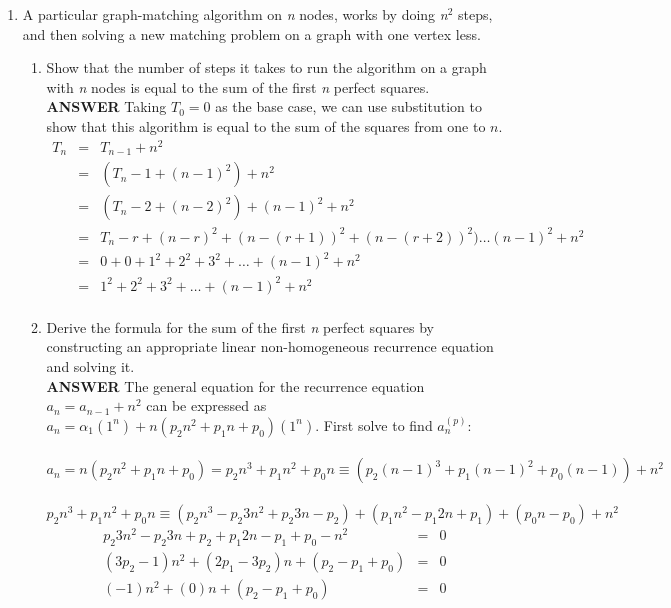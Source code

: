 \documentclass{article}
\begin{document}
\begin{enumerate}
\item
 A particular graph-matching algorithm on \textit{n} nodes,
works by doing \textit{n}$^{\mathit{2}}$ steps, and then solving a
new matching problem on a graph with one vertex less.

\begin{enumerate}
\item
 Show that the number of steps it takes to run the algorithm on a
graph with \textit{n} nodes is equal to the sum of the first
\textit{n}
perfect squares.\\
\vskip 10pt  \textbf{ANSWER}
 Taking $T_0 = 0$ as the base case, we can use substitution to show that this algorithm
is equal to the sum of the squares from one to $n$.
\begin{eqnarray*}
T_n & = & T_{n-1} + n^2 \\
& = & (T_n-1 + (n-1)^2) + n^2\\
& = & (T_n-2 + (n-2)^2) + (n-1)^2 + n^2\\
& = & T_n-r + (n-r)^2 + (n-(r+1))^2 + (n-(r+2))^2) \ldots (n-1)^2 + n^2\\
& = & 0 + 0 + 1^2 + 2^2 + 3^2 + \ldots + (n-1)^2 + n^2\\
& = & 1^2 + 2^2 + 3^2 + \ldots + (n-1)^2 + n^2\\
\end{eqnarray*}
\item
Derive the formula for the sum of the first \textit{n} perfect
squares by constructing an appropriate linear non-homogeneous
recurrence
equation and solving it.\\
\vskip 10pt  \textbf{ANSWER} The general equation for the
recurrence equation $a_n = a_{n-1} + n^2$ can be expressed as $a_n
= \alpha_1(1^n)
+ n(p_2 n^2 + p_1 n + p_0)(1^n)$. First solve to find $a^{(p)}_n$:\\\\
$a_n = n(p_2n^2 + p_1n + p_0) = p_2n^3 + p_1n^2 + p_0n \equiv (p_2(n-1)^3 + p_1(n-1)^2 + p_0(n-1)) + n^2$\\\\
$p_2n^3 + p_1n^2 + p_0n  \equiv( p_2n^3 - p_2 3 n^2  + p_2 3 n - p_2) + (p_1n^2 -p_1 2 n + p_1) + (p_0n - p_0) + n^2$\\
\begin{eqnarray*}
p_2 3 n^2  - p_2 3 n + p_2 + p_1 2 n - p_1 + p_0 - n^2 & = & 0\\
(3p_2 - 1)n^2 + (2p_1 - 3p_2)n + (p_2 - p_1 + p_0) & = & 0\\
(-1)n^2 + (0)n + (p_2 - p_1 + p_0) & = & 0\\

\end{eqnarray*}
\end{enumerate}
\end{enumerate}
\end{document}
